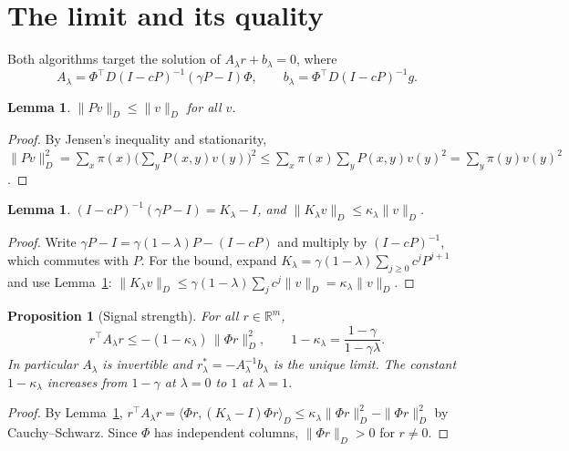 \documentclass[11pt]{article}
\newtheorem{lemma}[theorem]{Lemma}
\newtheorem{proposition}[theorem]{Proposition}
\theoremstyle{definition}
\theoremstyle{remark}
\newcommand{\R}{\mathbb{R}}
\newcommand{\inner}[2]{\langle #1, #2\rangle}
\begin{document}
\section{The limit and its quality}

Both algorithms target the solution of $A_\lambda r + b_\lambda = 0$, where
\[
  A_\lambda = \Phi^\top D (I - cP)^{-1}(\gamma P - I)\Phi, \qquad
  b_\lambda = \Phi^\top D (I - cP)^{-1} g .
\]

\begin{lemma}\label{lem:nonexp}
$\|Pv\|_D \le \|v\|_D$ for all $v$.
\end{lemma}
\begin{proof}
By Jensen's inequality and stationarity,
$\|Pv\|_D^2 = \sum_x \pi(x)\big(\sum_y P(x,y)v(y)\big)^2
\le \sum_x \pi(x)\sum_y P(x,y)v(y)^2 = \sum_y \pi(y) v(y)^2$.
\end{proof}

\begin{lemma}\label{lem:K}
$(I - cP)^{-1}(\gamma P - I) = K_\lambda - I$, and $\|K_\lambda v\|_D \le \kappa_\lambda\|v\|_D$.
\end{lemma}
\begin{proof}
Write $\gamma P - I = \gamma(1-\lambda)P - (I - cP)$ and multiply by $(I - cP)^{-1}$,
which commutes with $P$. For the bound, expand
$K_\lambda = \gamma(1-\lambda)\sum_{j\ge0} c^j P^{j+1}$ and use
Lemma~\ref{lem:nonexp}: $\|K_\lambda v\|_D \le \gamma(1-\lambda)\sum_j c^j\|v\|_D
= \kappa_\lambda\|v\|_D$.
\end{proof}

\begin{proposition}[Signal strength]\label{prop:signal}
For all $r \in \R^m$,
\[
  r^\top A_\lambda r \le -(1-\kappa_\lambda)\,\|\Phi r\|_D^2,
  \qquad 1 - \kappa_\lambda = \frac{1-\gamma}{1-\gamma\lambda}.
\]
In particular $A_\lambda$ is invertible and $r^*_\lambda = -A_\lambda^{-1}b_\lambda$ is
the unique limit. The constant $1-\kappa_\lambda$ increases from $1-\gamma$ at
$\lambda = 0$ to $1$ at $\lambda = 1$.
\end{proposition}
\begin{proof}
By Lemma~\ref{lem:K},
$r^\top A_\lambda r = \inner{\Phi r}{(K_\lambda - I)\Phi r}_D
\le \kappa_\lambda\|\Phi r\|_D^2 - \|\Phi r\|_D^2$ by Cauchy--Schwarz.
Since $\Phi$ has independent columns, $\|\Phi r\|_D > 0$ for $r \ne 0$.
\end{proof}
\end{document}
